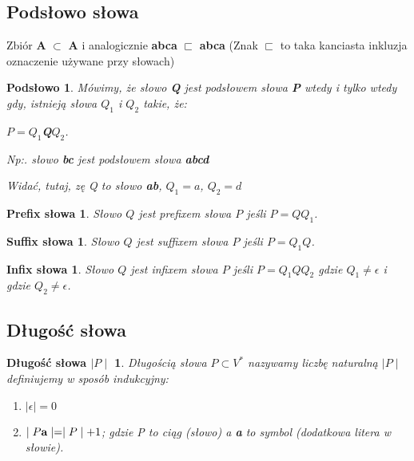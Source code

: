 \subsection{Podsłowo słowa}
Zbiór { \bf A } $\subset$   { \bf A } i analogicznie  { \bf abca } $\sqsubset$  { \bf abca }
(Znak $\sqsubset$  to taka kanciasta inkluzja oznaczenie używane przy słowach)


\newtheorem*{theorem9*}{Podsłowo}
\begin{theorem9*}
Mówimy, że słowo {\bf Q} jest podsłowem słowa {\bf P} wtedy i tylko wtedy gdy, istnieją słowa $Q_{1}$ i $Q_{2}$ takie, że:
\begin{center}
$P = Q_{1}${\bf Q}$Q_{2}$.
\end{center}
Np:. słowo {\bf bc} jest podsłowem słowa {\bf abcd} 


\begin{center}
\end{center}

Widać, tutaj, zę Q to słowo {\bf ab}, $Q_{1} = a$, $Q_{2}=d$
\end{theorem9*}
 

\newtheorem*{theorem10*}{Prefix słowa}
\begin{theorem10*}
Słowo $Q$ jest prefixem słowa $P$ jeśli $P = QQ_{1}$.
\end{theorem10*}
 
\newtheorem*{theorem11*}{Suffix słowa}
\begin{theorem11*}
Słowo $Q$ jest suffixem słowa $P$ jeśli $P =Q_{1}Q$.
\end{theorem11*}

\newtheorem*{theorem12*}{Infix słowa}
\begin{theorem12*}
Słowo $Q$ jest infixem słowa $P$ jeśli $P =Q_{1}QQ_{2}$  \newline
gdzie $Q_{1}\neq \epsilon$ i gdzie $Q_{2} \neq \epsilon$.
\end{theorem12*}



\subsection{Długość słowa}
\newtheorem*{theorem13*}{Długość słowa $\mid P\mid$}
\begin{theorem13*}
Długością słowa $P \subset V^{*}$ nazywamy liczbę naturalną $\mid P\mid$ definiujemy w sposób indukcyjny:
 
\begin{enumerate}[label=(\roman*)]
  \item $ \mid  \epsilon \mid=0$
  \item $ \mid P{ \bf a}  \mid= \mid P \mid + 1$; gdzie P to ciąg (słowo) a {\bf a} to symbol (dodatkowa litera w słowie).
\end{enumerate} 
 
\end{theorem13*}


